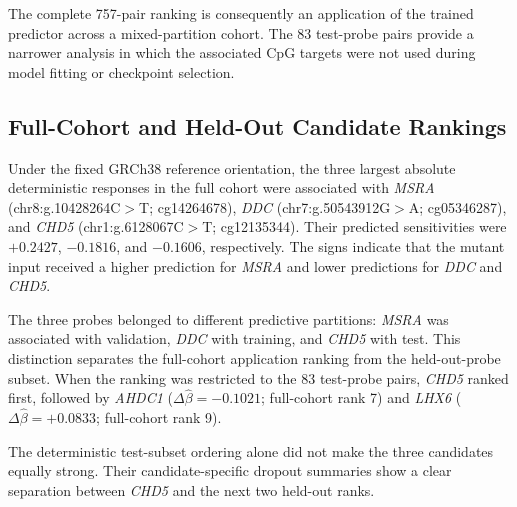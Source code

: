 \documentclass[10pt,letterpaper,twocolumn]{article}
\begin{document}
The complete 757-pair ranking is consequently an application of the
trained predictor across a mixed-partition cohort. The 83 test-probe
pairs provide a narrower analysis in which the associated CpG targets
were not used during model fitting or checkpoint selection.

\subsection{Full-Cohort and Held-Out Candidate Rankings}

Under the fixed GRCh38 reference orientation, the three largest
absolute deterministic responses in the full cohort were associated
with \textit{MSRA} (chr8:g.10428264C$>$T; cg14264678), \textit{DDC}
(chr7:g.50543912G$>$A; cg05346287), and \textit{CHD5}
(chr1:g.6128067C$>$T; cg12135344). Their predicted sensitivities were
$+0.2427$, $-0.1816$, and $-0.1606$, respectively. The signs indicate
that the mutant input received a higher prediction for \textit{MSRA}
and lower predictions for \textit{DDC} and \textit{CHD5}.

The three probes belonged to different predictive partitions:
\textit{MSRA} was associated with validation, \textit{DDC} with
training, and \textit{CHD5} with test. This distinction separates the
full-cohort application ranking from the held-out-probe subset. When the
ranking was restricted to the 83 test-probe pairs, \textit{CHD5}
ranked first, followed by \textit{AHDC1}
($\Delta\hat\beta=-0.1021$; full-cohort rank 7) and \textit{LHX6}
($\Delta\hat\beta=+0.0833$; full-cohort rank 9).

The deterministic test-subset ordering alone did not make the three
candidates equally strong. Their candidate-specific dropout summaries
show a clear separation between \textit{CHD5} and the next two held-out
ranks.

\begin{table}[H]
\centering
\caption{\textbf{Stability of the three highest deterministic
held-out-probe candidates.} MC intervals and ranks summarize 50 matched
dropout passes over the full cohort.}
\label{tab:heldout-top3-stability}
\small
{}
\end{table}
\end{document}
